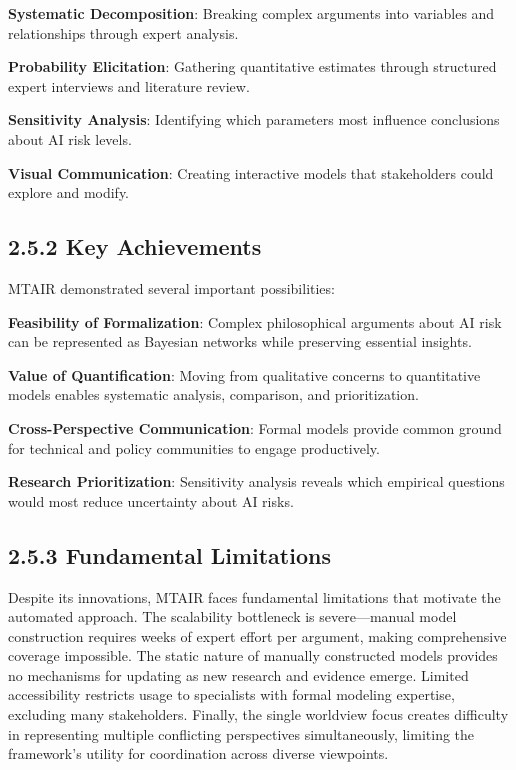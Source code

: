 \documentclass[
  11pt,
  letterpaper,
]{book}
\begin{document}
\textbf{Systematic Decomposition}: Breaking complex arguments into
variables and relationships through expert analysis.

\textbf{Probability Elicitation}: Gathering quantitative estimates
through structured expert interviews and literature review.

\textbf{Sensitivity Analysis}: Identifying which parameters most
influence conclusions about AI risk levels.

\textbf{Visual Communication}: Creating interactive models that
stakeholders could explore and modify.

\textcite{clarke2022}

\subsection*{2.5.2 Key Achievements}\label{sec-mtair-achievements}

MTAIR demonstrated several important possibilities:

\textbf{Feasibility of Formalization}: Complex philosophical arguments
about AI risk can be represented as Bayesian networks while preserving
essential insights.

\textbf{Value of Quantification}: Moving from qualitative concerns to
quantitative models enables systematic analysis, comparison, and
prioritization.

\textbf{Cross-Perspective Communication}: Formal models provide common
ground for technical and policy communities to engage productively.

\textbf{Research Prioritization}: Sensitivity analysis reveals which
empirical questions would most reduce uncertainty about AI risks.

\subsection*{2.5.3 Fundamental Limitations}\label{sec-mtair-limitations}

Despite its innovations, MTAIR faces fundamental limitations that
motivate the automated approach. The scalability bottleneck is
severe---manual model construction requires weeks of expert effort per
argument, making comprehensive coverage impossible. The static nature of
manually constructed models provides no mechanisms for updating as new
research and evidence emerge. Limited accessibility restricts usage to
specialists with formal modeling expertise, excluding many stakeholders.
Finally, the single worldview focus creates difficulty in representing
multiple conflicting perspectives simultaneously, limiting the
framework's utility for coordination across diverse viewpoints.
\end{document}
